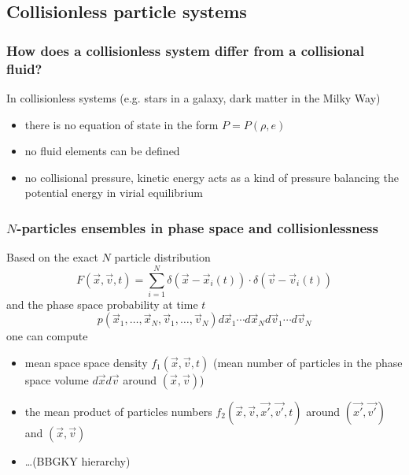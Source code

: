 \subsection*{Collisionless particle systems}

\subsubsection*{How does a collisionless system differ from a collisional
fluid?}
In collisionless systems (e.g. stars in a galaxy, dark matter in the Milky Way)
\begin{itemize}
    \item there is no equation of state in the form $P=P(\rho,e)$
    \item no fluid elements can be defined
    \item no collisional pressure, kinetic energy acts as a kind of pressure
    balancing the potential energy in virial equilibrium
\end{itemize}

\subsubsection*{$N$-particles ensembles in phase space and collisionlessness}
Based on the exact $N$ particle distribution
\begin{equation}
    F(\vec{x}, \vec{v}, t) = \sum_{i=1}^{N} \delta(\vec{x}-\vec{x}_i(t)) \cdot \delta(\vec{v}-\vec{v}_i(t))
\end{equation}
and the phase space probability at time $t$
\begin{equation}
    p\left(\vec{x}_1, \ldots, \vec{x}_N, \vec{v}_1, \ldots, \vec{v}_N\right) d \vec{x}_1 \cdots d \vec{x}_N d \vec{v}_1 \cdots d \vec{v}_N
\end{equation}
one can compute
\begin{itemize}
    \item mean space space density $f_1(\vec{x},\vec{v},t)$ (mean number of particles
    in the phase space volume $d\vec{x}d\vec{v}$ around $(\vec{x},\vec{v})$)
    \item the mean product of particles numbers $f_2(\vec{x},\vec{v},\vec{x'},\vec{v'},t)$ around
    $(\vec{x'},\vec{v'})$ and $(\vec{x},\vec{v})$
    \item \dots (BBGKY hierarchy)
\end{itemize}
